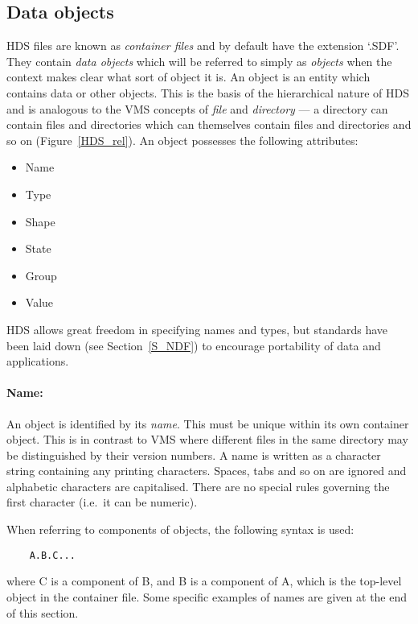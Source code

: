 \subsection{Data objects}
\label{S_datobj}

HDS files are known as {\em container files} and by default have the extension
`.SDF'.
They contain {\em data objects} which will be referred to simply as
{\em objects} when the context makes clear what sort of object it is.
An object is an entity which contains data or other objects.
This is the basis of the hierarchical nature of HDS and is analogous to the
VMS concepts of {\em file} and {\em directory} --- a directory can contain files
and directories which can themselves contain files and directories and so
on (Figure~\ref{HDS_rel}).
An object possesses the following attributes:
\begin{itemize}
\item Name
\item Type
\item Shape
\item State
\item Group
\item Value
\end{itemize}
HDS allows great freedom in specifying names and types, but standards have been
laid down (see Section~\ref{S_NDF}) to encourage portability of data and
applications.

\paragraph{Name:}\hfill

An object is identified by its {\em name}.
This must be unique within its own container object.
This is in contrast to VMS where different files in the same directory may be
distinguished by their version numbers.
A name is written as a character string containing any printing characters.
Spaces, tabs and so on are ignored and alphabetic characters are capitalised.
There are no special rules governing the first character (i.e.\ it can be
numeric).

When referring to components of objects, the following syntax is used:

\begin{small}
\begin{verbatim}
    A.B.C...
\end{verbatim}
\end{small}

where C is a component of B, and B is a component of A, which is the top-level
object in the container file. 
Some specific examples of names are given at the end of this section.

